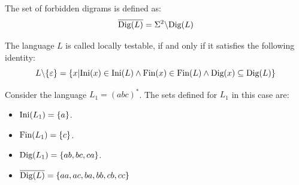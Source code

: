 \begin{definition}
    The set of forbidden digrams is defined as: 
    \[\overline{\textnormal{Dig}(L)}=\Sigma^{2} \backslash\textnormal{Dig}(L)\]
\end{definition}
\begin{definition}
    The language $L$ is called locally testable, if and only if it satisfies the following identity: 
    \[L\backslash\{\varepsilon\}=\{x|\textnormal{Ini}(x)\in \textnormal{Ini}(L) \land \textnormal{Fin}(x)\in \textnormal{Fin}(L)\land \textnormal{Dig}(x)\subseteq \textnormal{Dig}(L)\}\]
\end{definition}
\begin{example}
    Consider the language $L_1=(abc)^{*}$. 
    The sets defined for $L_1$ in this case are:
    \begin{itemize}
        \item $\textnormal{Ini}(L_1)=\{a\}$.
        \item $\textnormal{Fin}(L_1)=\{c\}$.
        \item $\textnormal{Dig}(L_1)=\{ab,bc,ca\}$.
        \item $\overline{\textnormal{Dig}(L)}=\{aa,ac,ba,bb,cb,cc\}$
    \end{itemize}
\end{example}

